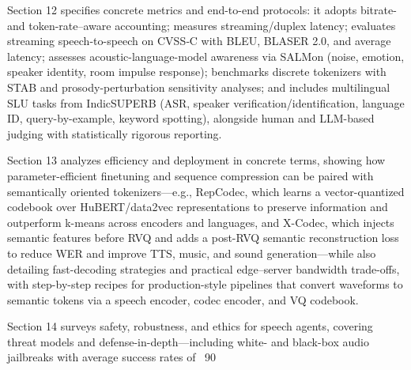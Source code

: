 \documentclass{article}
\begin{document}
Section 12 specifies concrete metrics and end-to-end protocols: it adopts bitrate- and token-rate–aware accounting; measures streaming/duplex latency; evaluates streaming speech-to-speech on CVSS‑C with BLEU, BLASER 2.0, and average latency; assesses acoustic-language-model awareness via SALMon (noise, emotion, speaker identity, room impulse response); benchmarks discrete tokenizers with STAB and prosody-perturbation sensitivity analyses; and includes multilingual SLU tasks from IndicSUPERB (ASR, speaker verification/identification, language ID, query-by-example, keyword spotting), alongside human and LLM-based judging with statistically rigorous reporting. \cite{onda2025benchmarkingprosodyencodingdiscretespeec,vashishth2024stabspeechtokenizerassessmentbenchmark,entry2025indicsuperbspeechprocessinguniversalperf,maimon2025salmonsuiteacousticlanguagemodelevaluati,zhao2024textlessstreamingspeechtranslationsemant} 



Section 13 analyzes efficiency and deployment in concrete terms, showing how parameter-efficient finetuning and sequence compression can be paired with semantically oriented tokenizers—e.g., RepCodec, which learns a vector-quantized codebook over HuBERT/data2vec representations to preserve information and outperform k-means across encoders and languages, and X-Codec, which injects semantic features before RVQ and adds a post-RVQ semantic reconstruction loss to reduce WER and improve TTS, music, and sound generation—while also detailing fast-decoding strategies and practical edge–server bandwidth trade-offs, with step-by-step recipes for production-style pipelines that convert waveforms to semantic tokens via a speech encoder, codec encoder, and VQ codebook. \cite{ye2024codecdoesmatterexploringsemanticshortcom,huang2024repcodecspeechrepresentationcodectokeniz} 



Section 14 surveys safety, robustness, and ethics for speech agents, covering threat models and defense-in-depth—including white- and black-box audio jailbreaks with average success rates of ~90%
\end{document}

